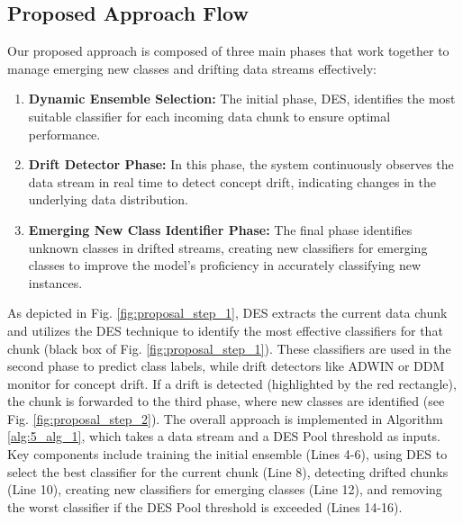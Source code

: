 \subsection{Proposed Approach Flow}
\label{proposed_overview}
Our proposed approach is composed of three main phases that work together to manage emerging new classes and drifting data streams effectively:
\begin{enumerate}
	\item \textbf{Dynamic Ensemble Selection:} The initial phase, DES, identifies the most suitable classifier for each incoming data chunk to ensure optimal performance.
	\item \textbf{Drift Detector Phase:} In this phase, the system continuously observes the data stream in real time to detect concept drift, indicating changes in the underlying data distribution.
	\item \textbf{Emerging New Class Identifier Phase:} The final phase identifies unknown classes in drifted streams, creating new classifiers for emerging classes to improve the model's proficiency in accurately classifying new instances.
\end{enumerate}
As depicted in Fig. \ref{fig:proposal_step_1}, DES extracts the current data chunk and utilizes the DES technique to identify the most effective classifiers for that chunk (black box of Fig. \ref{fig:proposal_step_1}). These classifiers are used in the second phase to predict class labels, while drift detectors like ADWIN or DDM monitor for concept drift. If a drift is detected (highlighted by the red rectangle), the chunk is forwarded to the third phase, where new classes are identified (see Fig. \ref{fig:proposal_step_2}). The overall approach is implemented in Algorithm \ref{alg:5_alg_1}, which takes a data stream and a DES Pool threshold as inputs. Key components include training the initial ensemble (Lines 4-6), using DES to select the best classifier for the current chunk (Line 8), detecting drifted chunks (Line 10), creating new classifiers for emerging classes (Line 12), and removing the worst classifier if the DES Pool threshold is exceeded (Lines 14-16).

